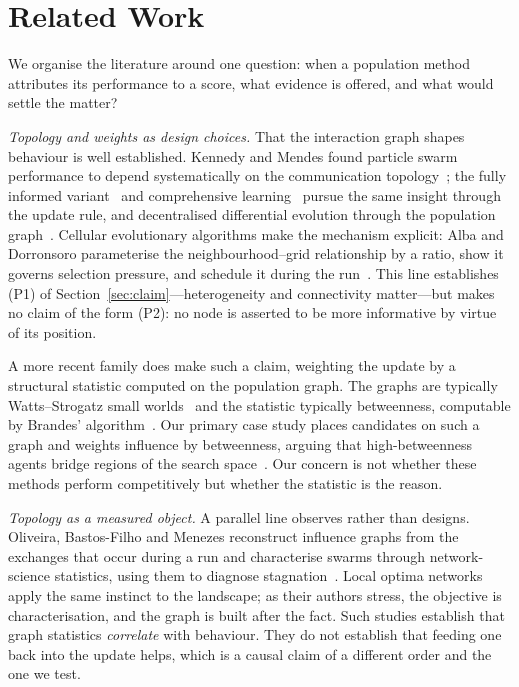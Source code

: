 \section{Related Work}
\label{sec:related}

We organise the literature around one question: when a population method
attributes its performance to a score, what evidence is offered, and what would
settle the matter?

\emph{Topology and weights as design choices.} That the interaction graph
shapes behaviour is well established. Kennedy and Mendes found particle swarm
performance to depend systematically on the communication
topology~\cite{kennedy2002population}; the fully informed
variant~\cite{mendes2004fully} and comprehensive learning~\cite{liang2006clpso}
pursue the same insight through the update rule, and decentralised differential
evolution through the population graph~\cite{dorronsoro2011cellular}. Cellular
evolutionary algorithms make the mechanism explicit: Alba and Dorronsoro
parameterise the neighbourhood--grid relationship by a ratio, show it governs
selection pressure, and schedule it during the
run~\cite{alba2005exploration}. This line establishes (P1) of
Section~\ref{sec:claim}---heterogeneity and connectivity matter---but makes no
claim of the form (P2): no node is asserted to be more informative by virtue of
its position.

A more recent family does make such a claim, weighting the update by a
structural statistic computed on the population graph. The graphs are typically
Watts--Strogatz small worlds~\cite{watts1998collective} and the statistic
typically betweenness, computable by Brandes'
algorithm~\cite{brandes2001faster}. Our primary case study places candidates on
such a graph and weights influence by betweenness, arguing that
high-betweenness agents bridge regions of the search
space~\cite{jalali2026social}. Our concern is not whether these methods perform
competitively but whether the statistic is the reason.

\emph{Topology as a measured object.} A parallel line observes rather than
designs. Oliveira, Bastos-Filho and Menezes reconstruct influence graphs from
the exchanges that occur during a run and characterise swarms through
network-science statistics, using them to diagnose
stagnation~\cite{oliveira2015network,oliveira2020uncovering}. Local optima
networks~\cite{ochoa2008lon} apply the same instinct to the landscape; as their
authors stress, the objective is characterisation, and the graph is built after
the fact. Such studies establish that graph statistics \emph{correlate} with
behaviour. They do not establish that feeding one back into the update helps,
which is a causal claim of a different order and the one we test.

